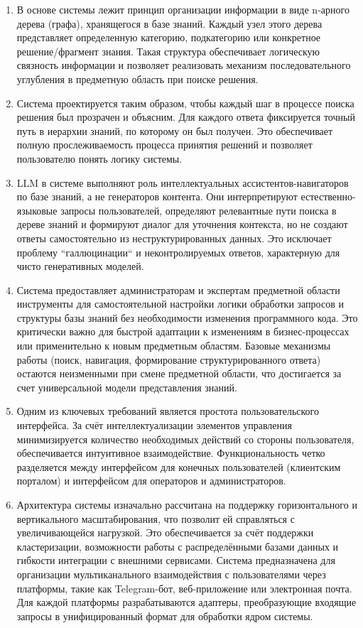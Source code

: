 \begin{enumerate}[label=\arabic*]
    \item В основе системы лежит принцип организации информации в виде n-арного дерева (графа), хранящегося в базе знаний. Каждый узел этого дерева представляет определенную категорию, подкатегорию или конкретное решение/фрагмент знания. Такая структура обеспечивает логическую связность информации и позволяет реализовать механизм последовательного углубления в предметную область при поиске решения.
    \item Система проектируется таким образом, чтобы каждый шаг в процессе поиска решения был прозрачен и объясним. Для каждого ответа фиксируется точный путь в иерархии знаний, по которому он был получен. Это обеспечивает полную прослеживаемость процесса принятия решений и позволяет пользователю понять логику системы.
    \item LLM в системе выполняют роль интеллектуальных ассистентов-навигаторов по базе знаний, а не генераторов контента. Они интерпретируют естественно-языковые запросы пользователей, определяют релевантные пути поиска в дереве знаний и формируют диалог для уточнения контекста, но не создают ответы самостоятельно из неструктурированных данных. Это исключает проблему ``галлюцинации`` и неконтролируемых ответов, характерную для чисто генеративных моделей.
    \item Система предоставляет администраторам и экспертам предметной области инструменты для самостоятельной настройки логики обработки запросов и структуры базы знаний без необходимости изменения программного кода. Это критически важно для быстрой адаптации к изменениям в бизнес-процессах или применительно к новым предметным областям. Базовые механизмы работы (поиск, навигация, формирование структурированного ответа) остаются неизменными при смене предметной области, что достигается за счет универсальной модели представления знаний.
    \item Одним из ключевых требований является простота пользовательского интерфейса. За счёт интеллектуализации элементов управления минимизируется количество необходимых действий со стороны пользователя, обеспечивается интуитивное взаимодействие. Функциональность четко разделяется между интерфейсом для конечных пользователей (клиентским порталом) и интерфейсом для операторов и администраторов.
    \item Архитектура системы изначально рассчитана на поддержку горизонтального и вертикального масштабирования, что позволит ей справляться с увеличивающейся нагрузкой. Это обеспечивается за счёт поддержки кластеризации, возможности работы с распределёнными базами данных и гибкости интеграции с внешними сервисами. Система предназначена для организации мультиканального взаимодействия с пользователями через платформы, такие как Telegram-бот, веб-приложение или электронная почта. Для каждой платформы разрабатываются адаптеры, преобразующие входящие запросы в унифицированный формат для обработки ядром системы.
\end{enumerate}


